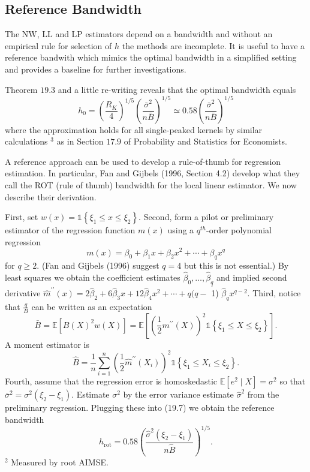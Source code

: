 \documentclass[10pt]{article}
\begin{document}
\subsection{Reference Bandwidth}
The NW, LL and LP estimators depend on a bandwidth and without an empirical rule for selection of $h$ the methods are incomplete. It is useful to have a reference bandwith which mimics the optimal bandwidth in a simplified setting and provides a baseline for further investigations.

Theorem $19.3$ and a little re-writing reveals that the optimal bandwidth equals
$$
h_{0}=\left(\frac{R_{K}}{4}\right)^{1 / 5}\left(\frac{\bar{\sigma}^{2}}{n \bar{B}}\right)^{1 / 5} \simeq 0.58\left(\frac{\bar{\sigma}^{2}}{n \bar{B}}\right)^{1 / 5}
$$
where the approximation holds for all single-peaked kernels by similar calculations ${ }^{3}$ as in Section $17.9$ of Probability and Statistics for Economists.

A reference approach can be used to develop a rule-of-thumb for regression estimation. In particular, Fan and Gijbels (1996, Section 4.2) develop what they call the ROT (rule of thumb) bandwidth for the local linear estimator. We now describe their derivation.

First, set $w(x)=\mathbb{1}\left\{\xi_{1} \leq x \leq \xi_{2}\right\}$. Second, form a pilot or preliminary estimator of the regression function $m(x)$ using a $q^{t h}$-order polynomial regression
$$
m(x)=\beta_{0}+\beta_{1} x+\beta_{2} x^{2}+\cdots+\beta_{q} x^{q}
$$
for $q \geq 2$. (Fan and Gijbels (1996) suggest $q=4$ but this is not essential.) By least squares we obtain the coefficient estimates $\widehat{\beta}_{0}, \ldots, \widehat{\beta}_{\underline{q}}$ and implied second derivative $\widehat{m}^{\prime \prime}(x)=2 \widehat{\beta}_{2}+6 \widehat{\beta}_{3} x+12 \widehat{\beta}_{4} x^{2}+\cdots+q(q-$ 1) $\widehat{\beta}_{q} x^{q-2}$. Third, notice that $\frac{q}{B}$ can be written as an expectation
$$
\bar{B}=\mathbb{E}\left[B(X)^{2} w(X)\right]=\mathbb{E}\left[\left(\frac{1}{2} m^{\prime \prime}(X)\right)^{2} \mathbb{1}\left\{\xi_{1} \leq X \leq \xi_{2}\right\}\right] .
$$
A moment estimator is
$$
\widehat{B}=\frac{1}{n} \sum_{i=1}^{n}\left(\frac{1}{2} \widehat{m}^{\prime \prime}\left(X_{i}\right)\right)^{2} \mathbb{1}\left\{\xi_{1} \leq X_{i} \leq \xi_{2}\right\} .
$$
Fourth, assume that the regression error is homoskedastic $\mathbb{E}\left[e^{2} \mid X\right]=\sigma^{2}$ so that $\bar{\sigma}^{2}=\sigma^{2}\left(\xi_{2}-\xi_{1}\right)$. Estimate $\sigma^{2}$ by the error variance estimate $\widehat{\sigma}^{2}$ from the preliminary regression. Plugging these into (19.7) we obtain the reference bandwidth
$$
h_{\mathrm{rot}}=0.58\left(\frac{\widehat{\sigma}^{2}\left(\xi_{2}-\xi_{1}\right)}{n \widehat{B}}\right)^{1 / 5} .
$$
${ }^{2}$ Measured by root AIMSE.
\end{document}

